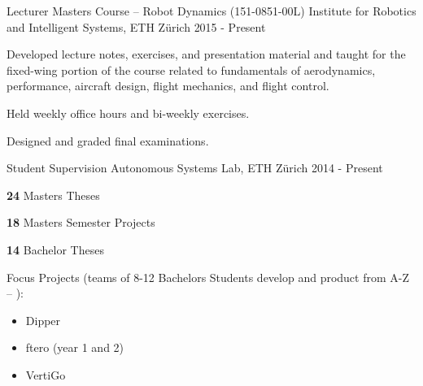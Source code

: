 \label{sec:teaching}
\begin{cventries}


\cvprojwideentry
  	{Lecturer} %
  	{Masters Course -- Robot Dynamics (151-0851-00L)} %
    {Institute for Robotics and Intelligent Systems, ETH Z\"{u}rich} %
    {2015 - Present} %
    {
      \begin{cvitems} %
        \item Developed lecture notes, exercises, and presentation material and taught for the fixed-wing portion of the course related to fundamentals of aerodynamics, performance, aircraft design, flight mechanics, and flight control.
		\item Held weekly office hours and bi-weekly exercises.
		\item Designed and graded final examinations.
      \end{cvitems}
    } %
    {} %
    {\showprojectdescriptions}
    {}

\cvprojwideentry
  	{Student Supervision} %
  	{} %
    {Autonomous Systems Lab, ETH Z\"{u}rich} %
    {2014 - Present} %
    {
      \begin{cvitems} %
        \item \textbf{24} Masters Theses
		\item \textbf{18} Masters Semester Projects
		\item \textbf{14} Bachelor Theses
		\item Focus Projects (teams of 8-12 Bachelors Students develop and product from A-Z -- ):
		\begin{itemize}[label=-]
			\item Dipper 
			\item ftero (year 1 and 2) 
			\item VertiGo 	
		\end{itemize}
      \end{cvitems}
    } %
    {} %
    {\showprojectdescriptions}
    {}
    

\end{cventries}
